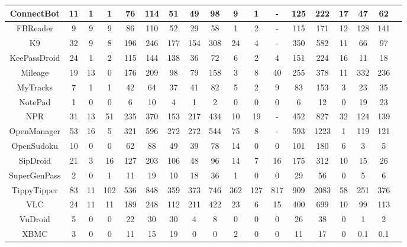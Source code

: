 \begin{table*}[!t]
\begin{threeparttable}[b]
\begin{tabular}{|c|c|c|c|c|c|c|c|c|c|c|c|c|c|c|c|c|c|}
\hline 
ConnectBot & 11 & 1 & 1 &    76& 114 & 51 & 49 & 98       &9 & 1 &- &    125 & 222 & 17    & 47 & 62\\ 
\hline 
FBReader & 9 & 9 & 9 &    86& 110 & 52 & 29 & 58       &1 & 2 &- &    115 & 171 & 12    & 128 & 141\\ 
\hline 
K9 & 32 & 9 & 8 &    196& 246 & 177 & 154 & 308       &24 & 4 &- &    350 & 582 & 11    & 66 & 97\\ 
\hline 
KeePassDroid & 24 & 1 & 2 &    115& 144 & 138 & 36 & 72       &6 & 2 &4 &    151 & 224 & 16    & 11 & 18\\ 
\hline 
Mileage & 19 & 13 & 0 &    176& 209 & 98 & 79 & 158       &3 & 8 &40 &    255 & 378 & 11    & 332 & 236\\ 
\hline 
MyTracks & 7 & 1 & 1 &    42& 64 & 37 & 41 & 82       &5 & 2 &9 &    83 & 153 & 3    & 23 & 35\\ 
\hline 
NotePad & 1 & 0 & 0 &    6& 10 & 4 & 1 & 2       &0 & 0 &0 &    6 & 12 & 0    & 19 & 23\\ 
\hline 
NPR & 31 & 13 & 51 &    235& 370 & 153 & 217 & 434       &10 & 19 &- &    452 & 827 & 32    & 124 & 139\\ 
\hline 
OpenManager & 53 & 16 & 5 &    321& 596 & 272 & 272 & 544       &75 & 8 &- &    593 & 1223 & 1    & 119 & 121\\ 
\hline 
OpenSudoku & 10 & 0 & 0 &    62& 88 & 49 & 39 & 78       &14 & 0 &0 &    101 & 180 & 6    & 3 & 5\\ 
\hline 
SipDroid & 21 & 3 & 16 &    127& 203 & 106 & 48 & 96       &14 & 7 &16 &    175 & 312 & 10    & 15 & 26\\ 
\hline 
SuperGenPass & 2 & 0 & 1 &    11& 19 & 10 & 18 & 36       &1 & 0 &0 &    29 & 56 & 0    & 5 & 6\\ 
\hline 
TippyTipper & 83 & 11 & 102 &    536& 848 & 359 & 373 & 746       &362 & 127 &817 &    909 & 2083 & 58    & 251 & 376\\ 
\hline 
VLC & 24 & 11 & 11 &    189& 248 & 112 & 211 & 422       &23 & 6 &15 &    400 & 699 & 10    & 99 & 113\\ 
\hline 
VuDroid & 5 & 0 & 0 &    22& 30 & 30 & 4 & 8       &0 & 0 &0 &    26 & 38 & 0    & 1 & 2\\ 
\hline 
XBMC & 3 & 0 & 0 &    11& 15 & 19 & 0 & 0       &2 & 0 &0 &    11 & 17 & 0    & 0.1 & 0.1\\ 
\hline
\end{tabular}
\label{tb2: experiment1}  
\end{threeparttable}
\end{table*}


